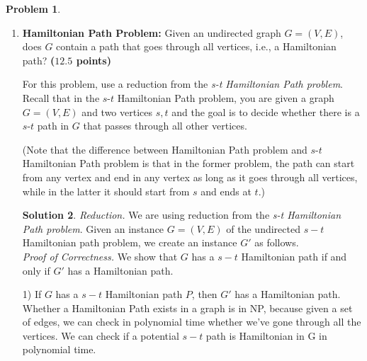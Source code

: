 \documentclass{article}
\theoremstyle{definition}
\newtheorem{problem}{Problem}
\newtheorem*{solution*}{Solution}
\newenvironment{solution}{\begin{solution*}}{{} \end{solution*}}
\newcommand{\grade}[1]{\hfill{\textbf{($\mathbf{#1}$ points)}}}
\begin{document}
\begin{problem}
\begin{enumerate}[label=(\alph*)]
\begin{solution}
		If $G$ is 3-colorable, then $G'$ can be 4-coloring exactly as $G$ with being the only vertex colored with the additional color. Similarly, if it is 4-colorable, then we know that the vertex $v$ must be the only vertex of its color – this is because it is connected to every other vertex in $G'$. Thus, we know that $G$ must be 3-colorable.\\
		
		\emph{Runtime Analysis.} This  reduction  can  be  implemented  in $O(n+m)$  time  and  hence  a  poly-time algorithm for 3-coloring problem which in turn implies P = NP (by definition of 3-coloring problem being NP-hard).  Thus a poly-time algorithm for 4-coloring also implies P = NP, making this problem NP-hard. \\
		
		
		\end{solution}
		
		\newpage
		\item \textbf{Hamiltonian Path Problem:} Given an undirected graph $G=(V,E)$, does $G$ contain a path that goes through all vertices, i.e., a Hamiltonian path?  \grade{12.5}
	
	\medskip
		For this problem, use a reduction from the \emph{s-t Hamiltonian Path problem}. Recall that in the $s$-$t$ Hamiltonian Path problem, you are given a graph $G=(V,E)$ and two vertices $s,t$ and the goal is to decide whether there is a $s$-$t$ 
		path in $G$ that passes through all other vertices. 
		
		(Note that the difference between Hamiltonian Path problem and $s$-$t$ Hamiltonian Path problem is that in the former problem, the path can start from any vertex and end in any vertex as long as it goes through all vertices, 
		while in the latter it should start from $s$ and ends at $t$.)
		
			\medskip
		\begin{solution}
		
		\emph{Reduction.} We are using reduction from the \emph{s-t Hamiltonian Path problem}.  Given  an  instance $G = (V, E)$  of  the  undirected $s-t$ Hamiltonian  path  problem,  we  create  an instance $G'$ as follows. \\

		\emph{Proof of Correctness.} We  show  that $G$ has a $s-t$ Hamiltonian  path  if  and  only  if $G'$ has a Hamiltonian path.
		
		1)  If $G$ has a $s-t$ Hamiltonian path $P$, then $G'$ has a Hamiltonian path. Whether a Hamiltonian Path exists in a graph is in NP, because given a set of edges, we can check in polynomial time whether we’ve gone through all the vertices. We can check if a potential $s-t$ path is Hamiltonian in G in polynomial time.
		

\end{solution}
\end{enumerate}
\end{problem}
\end{document}
